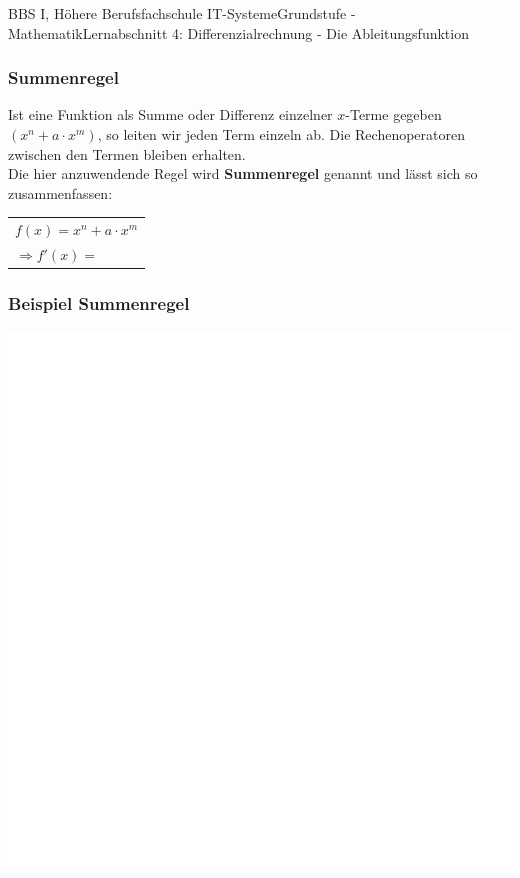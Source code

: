 \documentclass[11pt,twocolumn,oneside,openany,headings=optiontotoc,11pt,numbers=noenddot]{article}
\begin{document}
\begin{worksheet}{BBS I, Höhere Berufsfachschule IT-Systeme}{Grundstufe - Mathematik}{Lernabschnitt 4: Differenzialrechnung - Die Ableitungsfunktion}
		\subsubsection{Summenregel}
		Ist eine Funktion als Summe oder Differenz einzelner \(x\)-Terme gegeben \((x^n + a\cdot x^m)\), so leiten wir jeden Term einzeln ab. Die Rechenoperatoren zwischen den Termen bleiben erhalten.\\
		Die hier anzuwendende Regel wird \textbf{Summenregel} genannt und lässt sich so zusammenfassen:
		\begin{framed}
			\noindent
			\begin{tabularx}{0.8\textwidth}{X}
				\(f(x) = x^n + a\cdot x^m\)\\
				\(\Rightarrow f'(x) = \)
			\end{tabularx}
		\end{framed}
	
		\subsubsection*{Beispiel Summenregel}
		\includegraphics[scale=0.2]{../../empty.jpg}\\
		\\

\end{worksheet}
\end{document}
